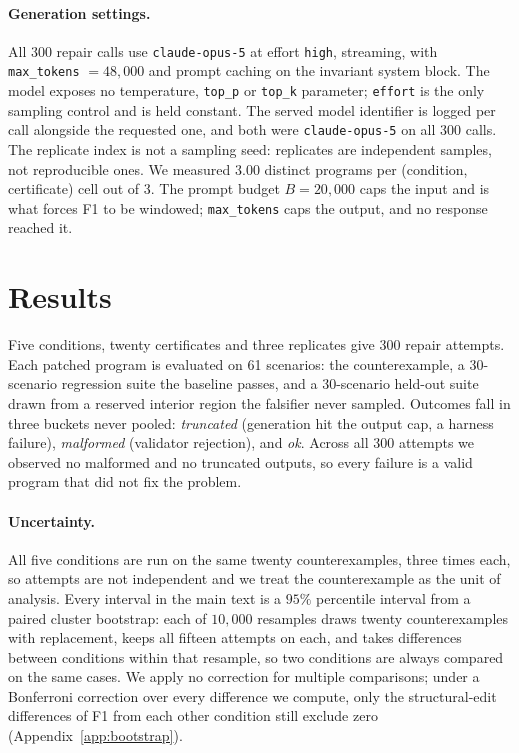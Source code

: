 \documentclass{article}
\begin{document}
\paragraph{Generation settings.}
All 300 repair calls use \texttt{claude-opus-5} at effort \texttt{high}, streaming, with
\texttt{max\_tokens} $=48{,}000$ and prompt caching on the invariant system
block. The model exposes no temperature, \texttt{top\_p} or \texttt{top\_k}
parameter; \texttt{effort} is the only sampling control and is held constant.
The served model identifier is logged per call alongside the requested one, and
both were \texttt{claude-opus-5} on all 300 calls. The replicate index is not a sampling seed: replicates are
independent samples, not reproducible ones. We measured $3.00$ distinct programs
per (condition, certificate) cell out of $3$. The prompt budget $B = 20{,}000$
caps the input and is what forces F1 to be windowed; \texttt{max\_tokens} caps the
output, and no response reached it.

\section{Results}
\label{sec:results}

Five conditions, twenty certificates and three replicates give 300 repair
attempts. Each patched program is evaluated on 61 scenarios: the counterexample,
a 30-scenario regression suite the baseline passes, and a 30-scenario held-out
suite drawn from a reserved interior region the falsifier never sampled.
Outcomes fall in three buckets never pooled: \emph{truncated} (generation hit the
output cap, a harness failure), \emph{malformed} (validator rejection), and
\emph{ok}. Across all 300 attempts we observed no malformed and no truncated
outputs, so every failure is a valid program that did not fix the problem.

\paragraph{Uncertainty.} All five conditions are run on the same twenty
counterexamples, three times each, so attempts are not independent and we treat
the counterexample as the unit of analysis. Every interval in the main text is a $95\%$
percentile interval from a paired cluster bootstrap: each of $10{,}000$ resamples
draws twenty counterexamples with replacement, keeps all fifteen attempts on
each, and takes differences between conditions within that resample, so two
conditions are always compared on the same cases. We apply no correction for
multiple comparisons; under a Bonferroni correction over every difference we
compute, only the structural-edit differences of F1 from each other condition
still exclude zero (Appendix~\ref{app:bootstrap}).
\end{document}
